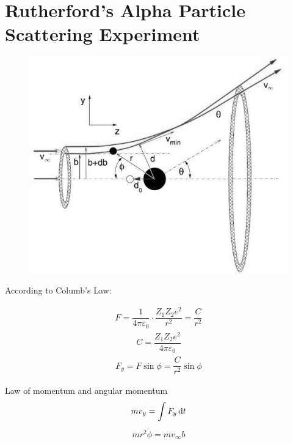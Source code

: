\chapter{Rutherford's Alpha Particle Scattering Experiment}

\begin{figure}[H]
  \centering
  \includegraphics[width=0.5\linewidth]{figures/Rutherford}
  \label{fig:}
\end{figure}

According to Columb's Law:

\begin{equation*}
  \begin{aligned}
    F = \dfrac{1}{4 \pi \varepsilon_0} \cdot \dfrac{Z_1 Z_2 e^2}{r^2} = \dfrac{C}{r^2}
  \end{aligned}
\end{equation*}
\begin{equation*}
  \begin{aligned}
    C = \dfrac{Z_1 Z_2 e^2}{4 \pi \varepsilon_0} 
  \end{aligned}
\end{equation*}
\begin{equation*}
  \begin{aligned}
    F_y = F \sin \phi = \dfrac{C}{r^2} \sin \phi 
  \end{aligned}
\end{equation*}

Law of momentum and angular momentum
\begin{equation*}
  \begin{aligned}
    m v_y = \int F_y \mathop{}\!\mathrm{d} t
  \end{aligned}
\end{equation*}
\begin{equation*}
  \begin{aligned}
    m r^2 \dot{\phi} = m v_{\infty} b
  \end{aligned}
\end{equation*}

